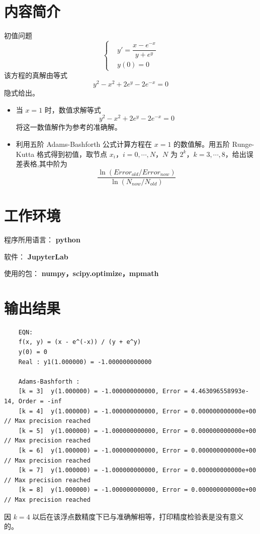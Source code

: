 \documentclass{ctexart}
\begin{document}
\section*{内容简介}
	\noindent 初值问题
	\begin{equation}
	\left\{\begin{aligned}
		& y' = \dfrac{x − e^{−x}}{y + e^y}\\
		& y(0) = 0
	\end{aligned}\right.
	\end{equation}
	该方程的真解由等式
	\begin{equation}
		y^2 − x^2 + 2e^y − 2e^{−x} = 0
	\end{equation}
	隐式给出。
	\begin{itemize}
		\item 当 $x = 1$ 时，数值求解等式
		\begin{equation*}
			y^2 − x^2 + 2e^y − 2e^{−x} = 0
		\end{equation*}
		将这一数值解作为参考的准确解。
		
		\item 利用五阶 Adams-Bashforth 公式计算方程在 $x = 1$ 的数值解。用五阶 Runge-Kutta 格式得到初值，取节点 $x_i$，$i = 0,\cdots,N$，$N$ 为 $2^k$，$k = 3,\cdots, 8$，给出误差表格,其中阶为
		\begin{equation}
			\dfrac{\ln(Error_{old} / Error_{now})}{\ln(N_{now} / N_{old})}		
		\end{equation}
	\end{itemize}
	
	
\section*{工作环境}
	程序所用语言： {\bf python}
	
	软件： {\bf JupyterLab}
	
	使用的包： {\bf numpy，scipy.optimize，mpmath }

\section*{输出结果}

\begin{verbatim}
	EQN:
	f(x, y) = (x - e^(-x)) / (y + e^y)
	y(0) = 0
	Real : y1(1.000000) = -1.000000000000
	
	Adams-Bashforth :
	[k = 3]  y(1.000000) = -1.000000000000, Error = 4.463096558993e-14, Order = -inf
	[k = 4]  y(1.000000) = -1.000000000000, Error = 0.000000000000e+00 // Max precision reached
	[k = 5]  y(1.000000) = -1.000000000000, Error = 0.000000000000e+00 // Max precision reached
	[k = 6]  y(1.000000) = -1.000000000000, Error = 0.000000000000e+00 // Max precision reached
	[k = 7]  y(1.000000) = -1.000000000000, Error = 0.000000000000e+00 // Max precision reached
	[k = 8]  y(1.000000) = -1.000000000000, Error = 0.000000000000e+00 // Max precision reached
\end{verbatim}
	因 $k = 4$ 以后在该浮点数精度下已与准确解相等，打印精度检验表是没有意义的。
	
\end{document}

